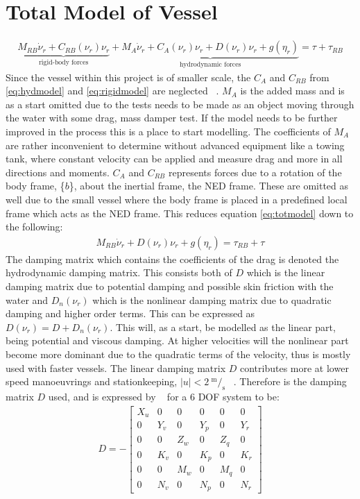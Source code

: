 \section{Total Model of Vessel}
\begin{align}
\underbrace{M_{RB} \dot \nu_r + C_{RB}(\nu_r)\nu_r}_{\text{rigid-body forces}} + \underbrace{M_A \dot \nu_r + C_A(\nu_r)\nu_r + D(\nu_r)\nu_r + g(\eta_r)}_{\text{hydrodynamic forces}}  = \tau + \tau_{RB}
\label{eq:totmodel}
\end{align}
 Since the vessel within this project is of smaller scale, the $C_A$ and $C_{RB}$ from \ref{eq:hydmodel} and \ref{eq:rigidmodel} are neglected ~\citep[eq. (2.23)]{fullactuatship}. $M_A$ is the added mass and is as a start omitted due to the tests needs to be made as an object moving through the water with some drag, mass damper test. If the model needs to be further improved in the process this is a place to start modelling. The coefficients of $M_A$ are rather inconvenient to determine without advanced equipment like a towing tank, where constant velocity can be applied and measure drag and more in all directions and moments. $C_A$ and $C_{RB}$ represents forces due to a rotation of the body frame, \{$b$\}, about the inertial frame, the NED frame. These are omitted as well due to the small vessel where the body frame is placed in a predefined local frame which acts as the NED frame. This reduces equation \ref{eq:totmodel} down to the following:
\begin{align}
M_{RB} \dot \nu_r + D(\nu_r)\nu_r + g(\eta_r) = \tau_{RB} + \tau
\label{eq:reducedmodel}
\end{align}
The damping matrix which contains the coefficients of the drag is denoted the hydrodynamic damping matrix. This consists both of $D$ which is the linear damping matrix due to potential damping and possible skin friction with the water and $D_n(\nu_r)$ which is the nonlinear damping matrix due to quadratic damping and higher order terms. This can be expressed as $D(\nu_r) = D + D_n(\nu_r)$. This will, as a start, be modelled as the linear part, being potential and viscous damping. At higher velocities will the nonlinear part become more dominant due to the quadratic terms of the velocity, thus is mostly used with faster vessels. The linear damping matrix $D$ contributes more at lower speed manoeuvrings and stationkeeping, $|u| < 2 \ ^\text{m}/_\text{s}$ ~\citep[fig. (7.2)]{fossen}. Therefore is the damping matrix $D$ used, and is expressed by ~\citep[eq. (6.62)]{fossen} for a 6 \ac{DOF} system to be:
\begin{align}
D =-
\begin{bmatrix}
X_u & 0 & 0 & 0 & 0 & 0\\
0 & Y_v & 0 & Y_p & 0 & Y_r\\
0 & 0 & Z_w & 0 & Z_q & 0\\
0 & K_v & 0 & K_p & 0 & K_r\\
0 & 0 & M_w & 0 & M_q & 0\\
0 & N_v & 0 & N_p & 0 & N_r
\end{bmatrix}
\label{eq:6dofd}
\end{align}

